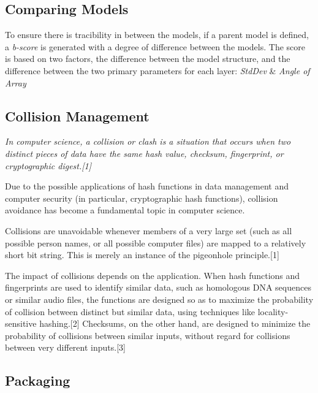 \subsection{Comparing Models}
To ensure there is tracibility in between the models, if a parent model is defined, a \textit{b-score} is generated with a degree of difference between the models. The score is based on two factors, the difference between the model structure, and the difference between the two primary parameters for each layer: \textit{StdDev} \& \textit{Angle of Array}

\subsection{Collision Management}

{ \itshape
In computer science, a collision or clash is a situation that occurs when two distinct pieces of data have the same hash value, checksum, fingerprint, or cryptographic digest.[1]

Due to the possible applications of hash functions in data management and computer security (in particular, cryptographic hash functions), collision avoidance has become a fundamental topic in computer science.

Collisions are unavoidable whenever members of a very large set (such as all possible person names, or all possible computer files) are mapped to a relatively short bit string. This is merely an instance of the pigeonhole principle.[1]

The impact of collisions depends on the application. When hash functions and fingerprints are used to identify similar data, such as homologous DNA sequences or similar audio files, the functions are designed so as to maximize the probability of collision between distinct but similar data, using techniques like locality-sensitive hashing.[2] Checksums, on the other hand, are designed to minimize the probability of collisions between similar inputs, without regard for collisions between very different inputs.[3]
}


\subsection{Packaging}